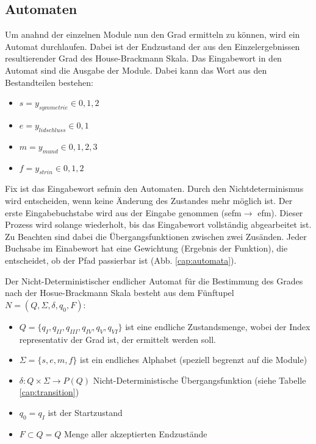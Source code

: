 \subsection{Automaten}\label{automata}
Um anahnd der einzelnen Module nun den Grad ermitteln zu können, wird ein Automat durchlaufen. Dabei ist der Endzustand der aus den Einzelergebnissen resultierender Grad des House-Brackmann Skala. Das Eingabewort in den Automat sind die Ausgabe der Module. Dabei kann das Wort aus den Bestandteilen bestehen:

\begin{itemize}
\setlength\itemsep{-0.5em}
\item $s = y_{symmetrie}  \in  0, 1, 2 $
\item $e = y_{lidschluss} \in  0, 1 $
\item $m = y_{mund}       \in  0, 1, 2, 3 $
\item $f = y_{strin}      \in  0, 1, 2 $
\end{itemize}

Fix ist das Eingabewort \flqq sefm\frqq in den Automaten. Durch den Nichtdeterminismus wird  entscheiden, wenn keine Änderung des Zustandes mehr möglich ist. Der erste Eingabebuchstabe wird aus der Eingabe genommen (\flqq sefm\frqq $\rightarrow$ \flqq efm\frqq). Dieser Prozess wird solange wiederholt, bis das Eingabewort vollständig abgearbeitet ist. Zu Beachten sind dabei die Übergangsfunktionen zwischen zwei Zusänden. Jeder Buchsabe im Einabewort hat eine Gewichtung (Ergebnis der Funktion), die entscheidet, ob der Pfad passierbar ist (Abb. \ref{cap:automata}).

\vspace{0.5cm}

Der Nicht-Deterministischer endlicher Automat für die Bestimmung des Grades nach der Hosue-Brackmann Skala besteht aus dem Fünftupel $N = (Q, \Sigma, \delta, q_0, F)$:

\begin{itemize}
\item $Q=\{ q_I, q_{II}, q_{III}, q_{IV}, q_{V}, q_{VI} \}$  ist eine endliche Zustandsmenge, wobei der Index representativ der Grad ist, der ermittelt werden soll.
\item $\Sigma=\{ s, e, m, f \}$ ist ein endliches Alphabet (speziell begrenzt auf die Module)
\item $\delta:Q \times \Sigma \rightarrow P(Q)$ Nicht-Deterministische Übergangsfunktion (siehe Tabelle \ref{cap:transition})
\item $q_0=q_I$ ist der Startzustand
\item $F \subset Q = Q$ Menge aller akzeptierten Endzustände
\end{itemize}


